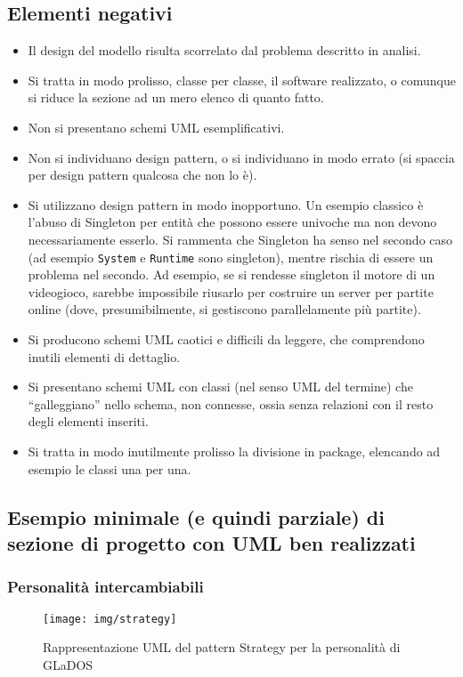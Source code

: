 \documentclass[a4paper,12pt]{report}
\begin{document}
	\subsection*{Elementi negativi}
	\begin{itemize}
		\item Il design del modello risulta scorrelato dal problema descritto in analisi.
		\item Si tratta in modo prolisso, classe per classe, il software realizzato, o comunque si riduce la sezione ad un mero elenco di quanto fatto.
		\item Non si presentano schemi UML esemplificativi.
		\item Non si individuano design pattern, o si individuano in modo errato (si spaccia per design pattern qualcosa che non lo è).
		\item Si utilizzano design pattern in modo inopportuno. Un esempio classico è l'abuso di
		Singleton per entità che possono essere univoche ma non devono necessariamente esserlo. Si rammenta
		che Singleton ha senso nel secondo caso (ad esempio \texttt{System} e \texttt{Runtime} sono
		singleton), mentre rischia di essere un problema nel secondo. Ad esempio, se si rendesse singleton
		il motore di un videogioco, sarebbe impossibile riusarlo per costruire un server per partite online
		(dove, presumibilmente, si gestiscono parallelamente più partite).
		\item Si producono schemi UML caotici e difficili da leggere, che comprendono inutili elementi di dettaglio.
		\item Si presentano schemi UML con classi (nel senso UML del termine) che ``galleggiano'' nello schema, non connesse, ossia senza relazioni con il resto degli elementi inseriti.
		\item Si tratta in modo inutilmente prolisso la divisione in package, elencando ad esempio le classi una per una.
	\end{itemize}
	
	\subsection*{Esempio minimale (e quindi parziale) di sezione di progetto con UML ben realizzati}
	
	\subsubsection{Personalità intercambiabili}
	
	\begin{figure}[H]
		\centering{}
		\texttt{[image: img/strategy]}
		\caption{Rappresentazione UML del pattern Strategy per la personalità di GLaDOS}
		\label{img:strategy}
	\end{figure}
	
\end{document}
